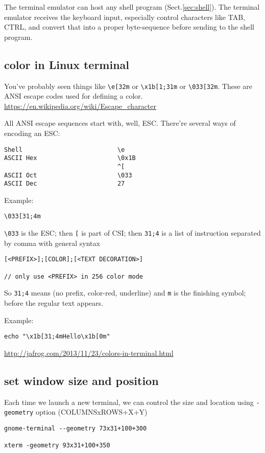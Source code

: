 The terminal emulator can host any shell program (Sect.\ref{sec:shell}).
The terminal emulator receives the keyboard input, especially control characters
like TAB, CTRL, and convert that into a proper byte-sequence before sending to
the shell program.


\subsection{color in Linux terminal}
\label{sec:color-terminal}

You've probably seen things like \verb!\e[32m! or \verb!\x1b[1;31m! or
\verb!\033[32m!. These are ANSI escape codes used for defining a color.
\url{https://en.wikipedia.org/wiki/Escape_character} 

All ANSI escape sequences start with, well, ESC. There're several ways of
encoding an ESC:
\begin{verbatim}
Shell		                   \e
ASCII Hex                      \0x1B
                               ^[
ASCII Oct                      \033
ASCII Dec		               27
\end{verbatim}

Example:
\begin{verbatim}
\033[31;4m
\end{verbatim}
\verb!\033! is the ESC; then \verb![! is part of CSI; then \verb!31;4! is a
list of instruction separated by comma with general syntax 
\begin{verbatim}
[<PREFIX>];[COLOR];[<TEXT DECORATION>]

// only use <PREFIX> in 256 color mode
\end{verbatim}
So \verb!31;4! means (no prefix, color-red, underline)
and \verb!m! is the finishing symbol; before the regular text appears.


Example:
\begin{verbatim}
echo "\x1b[31;4mHello\x1b[0m"
\end{verbatim}
\url{http://jafrog.com/2013/11/23/colors-in-terminal.html}

\subsection{set window size and position}

Each time we launch a new terminal, we can control the size and location using 
\verb!-geometry! option (COLUMNSxROWS+X+Y)
\begin{verbatim}
gnome-terminal --geometry 73x31+100+300

xterm -geometry 93x31+100+350
\end{verbatim}


